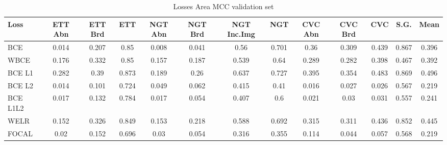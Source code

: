 \documentclass[journal, a4paper]{IEEEtran}
\begin{document}
\begin{table}[ht]
	\centering
	\begin{minipage}{\linewidth}
		\centering
		\begin{tabular}{||l c c c c c c c c c c c c||}
			\hline
			Loss     & ETT Abn & ETT Brd & ETT   & NGT Abn & NGT Brd & NGT Inc.Img & NGT   & CVC Abn & CVC Brd & CVC   & S.G.  & Mean  \\ [0.5ex] \hline\hline
			BCE      & 0.014   & 0.207   & 0.85  & 0.008   & 0.041   & 0.56        & 0.701 & 0.36    & 0.309   & 0.439 & 0.867 & 0.396 \\ \hline
			WBCE     & 0.176   & 0.332   & 0.85  & 0.157   & 0.187   & 0.539       & 0.64  & 0.289   & 0.282   & 0.398 & 0.467 & 0.392 \\ \hline
			BCE L1   & 0.282   & 0.39    & 0.873 & 0.189   & 0.26    & 0.637       & 0.727 & 0.395   & 0.354   & 0.483 & 0.869 & 0.496 \\ \hline
			BCE L2   & 0.014   & 0.101   & 0.724 & 0.049   & 0.062   & 0.415       & 0.41  & 0.016   & 0.027   & 0.026 & 0.567 & 0.219 \\ \hline
			BCE L1L2 & 0.017   & 0.132   & 0.784 & 0.017   & 0.054   & 0.407       & 0.6   & 0.021   & 0.03    & 0.031 & 0.557 & 0.241 \\ \hline
			WELR     & 0.152   & 0.326   & 0.849 & 0.153   & 0.218   & 0.588       & 0.692 & 0.315   & 0.311   & 0.436 & 0.852 & 0.445 \\ \hline
			FOCAL    & 0.02    & 0.152   & 0.696 & 0.03    & 0.054   & 0.316       & 0.355 & 0.114   & 0.044   & 0.057 & 0.568 & 0.219 \\ [0.5ex] \hline
		\end{tabular}
		\label{tab:loss_amcc}
		\caption{Losses Area MCC validation set}
	\end{minipage}
			  

\end{table}
\end{document}
